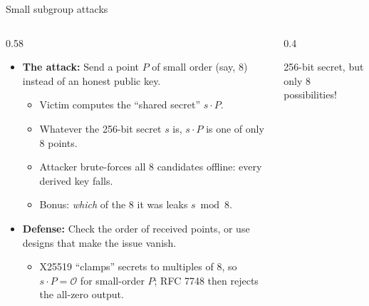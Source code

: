 \ifdefined\PRESENTATION\else\PassOptionsToClass{handout}{beamer}\fi\documentclass[aspectratio=169, lualatex]{beamer}
\begin{document}
\begin{frame}{Small subgroup attacks}
	\begin{columns}[c]
		\begin{column}{0.58\textwidth}
			\begin{itemize}
				\item \textbf{The attack:} Send a point $P$ of small order (say, 8) instead of an honest public key.
				      \begin{itemize}
					      \item Victim computes the ``shared secret'' $s \cdot P$.
					      \item Whatever the 256-bit secret $s$ is, $s \cdot P$ is one of only 8 points.
					      \item Attacker brute-forces all 8 candidates offline: every derived key falls.
					      \item Bonus: \emph{which} of the 8 it was leaks $s \bmod 8$.
				      \end{itemize}
				\item \textbf{Defense:} Check the order of received points, or use designs that make the issue vanish.
				      \begin{itemize}
					      \item X25519 ``clamps'' secrets to multiples of 8, so $s \cdot P = \mathcal{O}$ for small-order $P$; RFC 7748 then rejects the all-zero output.
				      \end{itemize}
			\end{itemize}
		\end{column}
		\begin{column}{0.4\textwidth}
			\begin{center}
			\end{center}
			\begin{center}
				\small 256-bit secret, but only 8 possibilities!
			\end{center}
		\end{column}
	\end{columns}
\end{frame}
\end{document}

